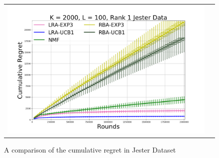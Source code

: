 \begin{figure}[!th]
\begin{tabular}{cc}
{%
      	\includegraphics[scale=0.2]{img/Figure_expt3.png}
  		\label{fig:6}
    }
 \end{tabular}
    \caption{A comparison of the cumulative regret in Jester Dataset }
    \label{fig:karmed}
    \vspace*{-1em}
\end{figure}